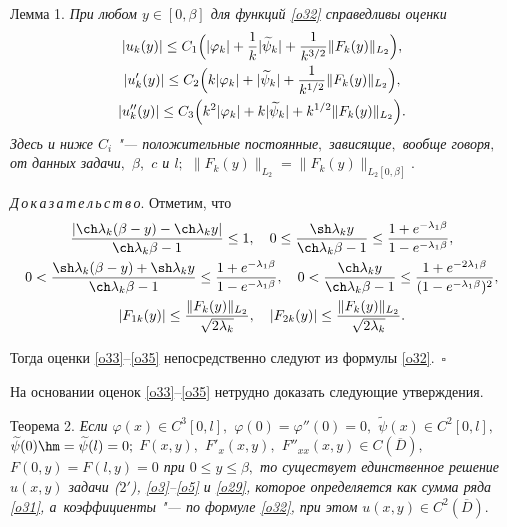{\small \sc Лемма 1.} \textit{При любом $y\in[0,\beta]$ для функций \eqref{o32} справедливы оценки
\begin{gather}\label{o33}
|u_k(y)|\leq C_1\Bigl(|\varphi_k|+\frac{1}{k}|\widetilde{\psi}_k|+\frac{1}{k^{3/2}}\|F_k(y)\|_{L_2}\Bigr),
\\
\label{o35}
|u'_k(y)|\leq C_2\Bigl(k|\varphi_k|+|\widetilde{\psi}_k|+\frac{1}{k^{1/2}}\|F_k(y)\|_{L_2}\Bigr),
\\
\label{o35}
|u''_k(y)|\leq C_3\Bigl(k^2|\varphi_k|+k|\widetilde{\psi}_k|+k^{1/2}\|F_k(y)\|_{L_2}\Bigr).
\end{gather}
Здесь и ниже $C_i$ "---  положительные постоянные$,$ зависящие$,$ вообще говоря$,$ от данных задачи$,$ $\beta,$ $c$ и $l;$ $\|F_k(y)\|_{L_2}=\|F_k(y)\|_{L_2[0,\beta]}.$}

\smallskip

\textit{Д\,о\,к\,а\,з\,а\,т\,е\,л\,ь\,с\,т\,в\,о}. Отметим, что
\begin{gather}
\frac{|\ch\lambda_k(\beta-y)-\ch\lambda_ky|}{\ch\lambda_k\beta-1}\leq1,\quad
0\leq\frac{\sh\lambda_ky}{\ch\lambda_k\beta-1}\leq\frac{1+e^{-\lambda_1\beta}}{1-e^{-\lambda_1\beta}},
\\
0<\frac{\sh\lambda_k(\beta-y)+\sh\lambda_ky}{\ch\lambda_k\beta-1}\leq\frac{1+e^{-\lambda_1\beta}}{1-e^{-\lambda_1\beta}},\quad 
0<\frac{\ch\lambda_ky}{\ch\lambda_k\beta-1}\leq\frac{1+e^{-2\lambda_1\beta}}{(1-e^{-\lambda_1\beta})^2},
\\
|F_{1k}(y)|\leq\frac{\|F_k(y)\|_{L_2}}{\sqrt{2\lambda_k}},\quad  
|F_{2k}(y)|\leq\frac{\|F_k(y)\|_{L_2}}{\sqrt{2\lambda_k}}.
\end{gather}


Тогда оценки \eqref{o33}--\eqref{o35} непосредственно следуют из формулы \eqref{o32}.~$\square$

\smallskip

На основании оценок \eqref{o33}--\eqref{o35} нетрудно доказать следующие утверждения.

\smallskip

\hypertarget{sab:th2}{}

{\small \sc Теорема 2.} \textit{Если $\varphi(x)\in C^3[0,l],$ 
$\varphi(0)=\varphi''(0)=0,$ 
$\widetilde{\psi}(x)\in C^2[0,l],$ 
$\widetilde{\psi}(0)\hm =\widetilde{\psi}(l)=0;$ 
$F(x,y),$ $F'_x(x,y),$ $F''_{xx}(x,y)\in C(\overline{D}),$ 
$F(0,y)=F(l,y)=0$ при $0\leq y\leq \beta,$ 
то существует единственное решение $u(x,y)$ задачи \em (\hyperlink{sab:(2')}{$2'$}),  \eqref{o3}--\eqref{o5} \em и \em \eqref{o29}, \em которое определяется как сумма ряда \em \eqref{o31}, \em а~коэффициенты "--- по формуле \em \eqref{o32}, \em при этом $u(x,y)\in C^2(\overline{D}).$}

